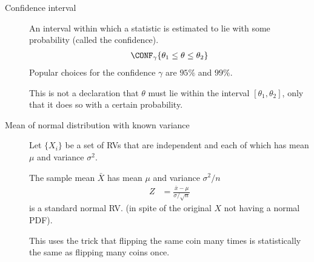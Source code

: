 \begin{description}
    \item[Confidence interval] An interval within which a statistic is estimated to
          lie with some probability (called the confidence).
          \begin{align}
              \CONF_\gamma\{\theta_1 \leq \theta \leq \theta_2\}
          \end{align}
          Popular choices for the confidence $ \gamma $ are $ 95\% $ and $ 99\% $. \par
          This is not a declaration that $ \theta $ must lie within the interval
          $ [\theta_1,\theta_2] $, only that it does so with a certain probability.

    \item[Mean of normal distribution with known variance] Let $ \{X_i\} $ be a set of
          RVs that are independent and each of which has mean $ \mu $ and variance
          $ \sigma^2 $. \par
          The sample mean $ \bar{X} $ has mean $ \mu $ and variance $ \sigma^2/n $
          \begin{align}
              Z & = \frac{\bar{x} - \mu}{\sigma/\sqrt{n}}
          \end{align}
          is a standard normal RV. (in spite of the original $ X $ not having a normal
          PDF). \par
          This uses the trick that flipping the same coin many times is statistically
          the same as flipping many coins once.


\end{description}
